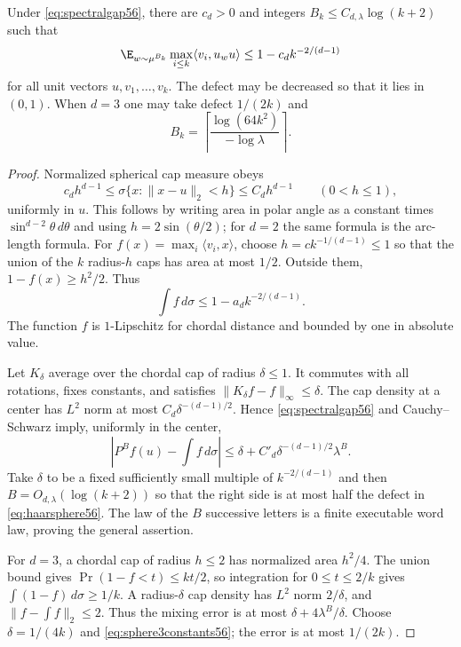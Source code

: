 \begin{lemma}\label{lem:sphericalgap56}
Under \eqref{eq:spectralgap56}, there are $c_d>0$ and integers $B_k\le C_{d,\lambda}\log(k+2)$ such that
\[
 \E_{w\sim\mu^{B_k}}\max_{i\le k}\langle v_i,u_w u\rangle
                  \le1-c_d k^{-2/(d-1)}
\]
for all unit vectors $u,v_1,\ldots,v_k$. The defect may be decreased so that it lies in $(0,1)$. When $d=3$ one may take defect $1/(2k)$ and
\begin{equation}\label{eq:sphere3constants56}
                  B_k=\left\lceil\frac{\log(64k^2)}{-\log\lambda}\right\rceil.
\end{equation}
\end{lemma}
\begin{proof}
Normalized spherical cap measure obeys
\[
       c_d h^{d-1}\le\sigma\{x:\|x-u\|_2<h\}\le C_d h^{d-1}
                     \qquad(0<h\le1),
\]
uniformly in $u$. This follows by writing area in polar angle as a constant times $\sin^{d-2}\theta\,d\theta$ and using $h=2\sin(\theta/2)$; for $d=2$ the same formula is the arc-length formula. For $f(x)=\max_i\langle v_i,x\rangle$, choose $h=c k^{-1/(d-1)}\le1$ so that the union of the $k$ radius-$h$ caps has area at most $1/2$. Outside them, $1-f(x)\ge h^2/2$. Thus
\begin{equation}\label{eq:haarsphere56}
                         \int f\,d\sigma\le1-a_d k^{-2/(d-1)}.
\end{equation}
The function $f$ is $1$-Lipschitz for chordal distance and bounded by one in absolute value.

Let $K_\delta$ average over the chordal cap of radius $\delta\le1$. It commutes with all rotations, fixes constants, and satisfies $\|K_\delta f-f\|_\infty\le\delta$. The cap density at a center has $L^2$ norm at most $C_d\delta^{-(d-1)/2}$. Hence \eqref{eq:spectralgap56} and Cauchy--Schwarz imply, uniformly in the center,
\[
 \left|P^B f(u)-\int f\,d\sigma\right|
 \le\delta+C'_d\delta^{-(d-1)/2}\lambda^B.
\]
Take $\delta$ to be a fixed sufficiently small multiple of $k^{-2/(d-1)}$ and then $B=O_{d,\lambda}(\log(k+2))$ so that the right side is at most half the defect in \eqref{eq:haarsphere56}. The law of the $B$ successive letters is a finite executable word law, proving the general assertion.

For $d=3$, a chordal cap of radius $h\le2$ has normalized area $h^2/4$. The union bound gives $\Pr(1-f<t)\le kt/2$, so integration for $0\le t\le2/k$ gives $\int(1-f)\,d\sigma\ge1/k$. A radius-$\delta$ cap density has $L^2$ norm $2/\delta$, and $\|f-\int f\|_2\le2$. Thus the mixing error is at most $\delta+4\lambda^B/\delta$. Choose $\delta=1/(4k)$ and \eqref{eq:sphere3constants56}; the error is at most $1/(2k)$.
\end{proof}


